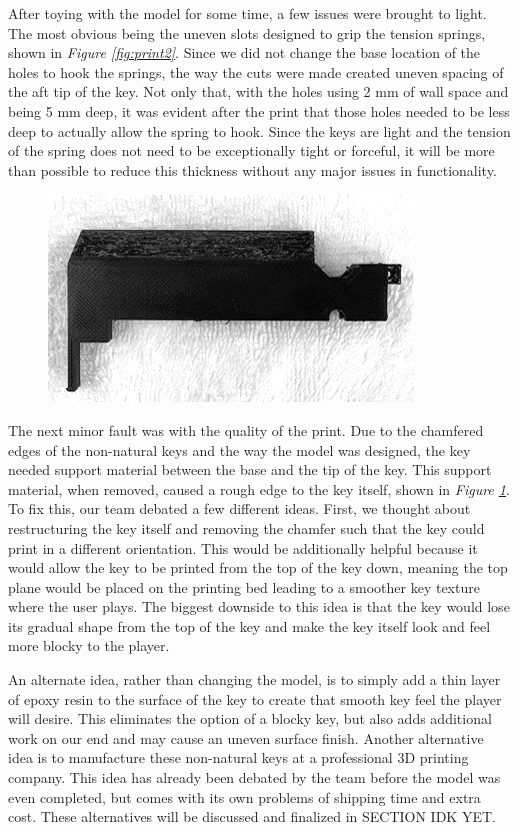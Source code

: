 After toying with the model for some time, a few issues were brought to light. The most obvious being the uneven slots designed to grip the tension springs, shown in \textit{Figure \ref{fig:print2}}. Since we did not change the base location of the holes to hook the springs, the way the cuts were made created uneven spacing of the aft tip of the key. Not only that, with the holes using 2 mm of wall space and being 5 mm deep, it was evident after the print that those holes needed to be less deep to actually allow the spring to hook. Since the keys are light and the tension of the spring does not need to be exceptionally tight or forceful, it will be more than possible to reduce this thickness without any major issues in functionality.

\begin{figure}[h!]
  \centering
  \includegraphics[width=0.8\linewidth]{image/Print3.png}
  \caption{}
  \label{fig:print3}
\end{figure}

The next minor fault was with the quality of the print. Due to the chamfered edges of the non-natural keys and the way the model was designed, the key needed support material between the base and the tip of the key. This support material, when removed, caused a rough edge to the key itself, shown in \textit{Figure \ref{fig:print3}}.  To fix this, our team debated a few different ideas. First, we thought about restructuring the key itself and removing the chamfer such that the key could print in a different orientation. This would be additionally helpful because it would allow the key to be printed from the top of the key down, meaning the top plane would be placed on the printing bed leading to a smoother key texture where the user plays. The biggest downside to this idea is that the key would lose its gradual shape from the top of the key and make the key itself look and feel more blocky to the player.

An alternate idea, rather than changing the model, is to simply add a thin layer of epoxy resin to the surface of the key to create that smooth key feel the player will desire. This eliminates the option of a blocky key, but also adds additional work on our end and may cause an uneven surface finish. Another alternative idea is to manufacture these non-natural keys at a professional 3D printing company. This idea has already been debated by the team before the model was even completed, but comes with its own problems of shipping time and extra cost. These alternatives will be discussed and finalized in SECTION IDK YET.

